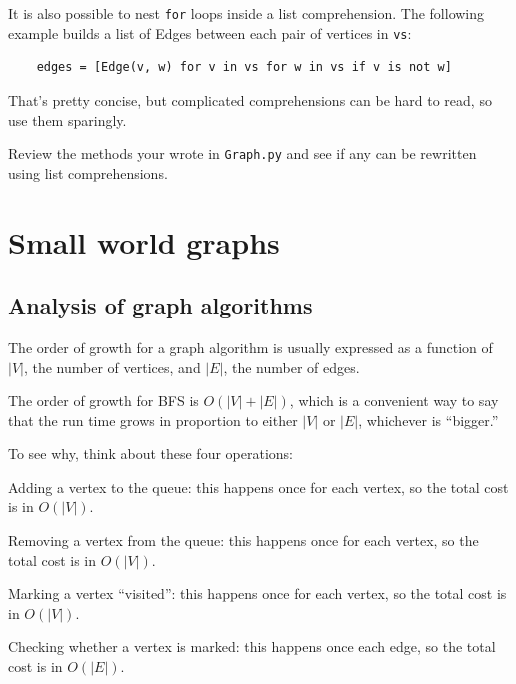 \documentclass[10pt]{book}
\begin{document}
It is also possible to nest {\tt for} loops inside
a list comprehension.  The following example builds a list
of Edges between each pair of vertices in {\tt vs}:

\begin{verbatim}
    edges = [Edge(v, w) for v in vs for w in vs if v is not w]
\end{verbatim}

That's pretty concise, but complicated comprehensions can be
hard to read, so use them sparingly.

\begin{exercise}

Review the methods your wrote in {\tt Graph.py} and see if any
can be rewritten using list comprehensions.

\end{exercise}


\chapter{Small world graphs}

\section{Analysis of graph algorithms}

\newcommand{\V}{|V|}
\newcommand{\E}{|E|}

The order of growth for a graph algorithm is usually expressed
as a function of $\V$, the number of vertices, and $\E$, the number
of edges.

The order of growth for BFS is $O(\V + \E)$, which is a convenient
way to say that the run time grows in proportion to either $\V$ or
$\E$, whichever is ``bigger.''

To see why, think about these four operations:

\begin{description}

\item Adding a vertex to the queue: this happens once for each
vertex, so the total cost is in $O(\V)$.

\item Removing a vertex from the queue: this happens once for each
vertex, so the total cost is in $O(\V)$.

\item Marking a vertex ``visited'': this happens once for each
vertex, so the total cost is in $O(\V)$.

\item Checking whether a vertex is marked: this happens once each
edge, so the total cost is in $O(\E)$.

\end{description}
\end{document}
